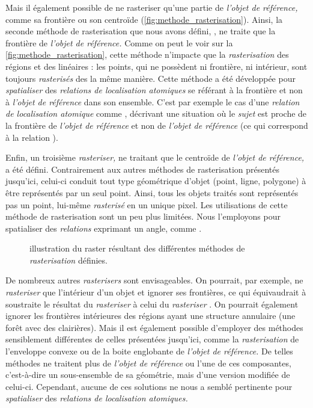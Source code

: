 Mais il également possible de ne rasteriser qu'une partie de
\emph{l'objet de référence,} comme sa frontière ou son centroïde
(\autoref{fig:methode_rasterisation}). Ainsi, la seconde méthode de
rasterisation que nous avons défini, , ne traite que
la frontière de \emph{l'objet de référence.} Comme on peut le voir sur
la \autoref{fig:methode_rasterisation}, cette méthode n'impacte que la
\emph{rasterisation} des régions et des linéaires : les points, qui ne
possèdent ni frontière, ni intérieur, sont toujours \emph{rasterisés}
des la même manière. Cette méthode a été développée pour
\emph{spatialiser} des \emph{relations de localisation atomiques} se
référant à la frontière et non à \emph{l'objet de référence} dans son
ensemble. C'est par exemple le cas d'une \emph{relation de
  localisation atomique} comme ,
décrivant une situation où le \emph{sujet} est proche de la frontière
de \emph{l'objet de référence} et non de \emph{l'objet de référence}
(ce qui correspond à la relation ).

Enfin, un troisième \emph{rasteriser,} ne traitant que le centroïde de
\emph{l'objet de référence,} a été défini. Contrairement aux autres
méthodes de rasterisation présentés jusqu'ici, celui-ci conduit tout
type géométrique d'objet (point, ligne, polygone) à être représentés
par un seul point. Ainsi, tous les objets traités sont représentés pas
un point, lui-même \emph{rasterisé} en un unique pixel. Les
utilisations de cette méthode de rasterisation sont un peu plus
limitées. Nous l'employons pour spatialiser des \emph{relations}
exprimant un angle, comme .

\begin{figure}
  \centering
  
  \caption{illustration du raster résultant des différentes méthodes
    de \emph{rasterisation} définies.}
  \label{fig:methode_rasterisation}
\end{figure}

De nombreux autres \emph{rasterisers} sont envisageables. On pourrait,
par exemple, ne \emph{rasteriser} que l'intérieur d'un objet et
ignorer ses frontières, ce qui équivaudrait à soustraite le résultat
du \emph{rasteriser}  à celui du \emph{rasteriser}
. On pourrait également ignorer les frontières
intérieures des régions ayant une structure annulaire (\eg une forêt
avec des clairières). Mais il est également possible d'employer des
méthodes sensiblement différentes de celles présentées jusqu'ici,
comme la \emph{rasterisation} de l'enveloppe convexe ou de la boite
englobante de \emph{l'objet de référence.} De telles méthodes ne
traitent plus de \emph{l'objet de référence} ou l'une de ces
composantes, c'est-à-dire un sous-ensemble de sa géométrie, mais d'une
version modifiée de celui-ci. Cependant, aucune de ces solutions ne
nous a semblé pertinente pour \emph{spatialiser} des \emph{relations
  de localisation atomiques.}

